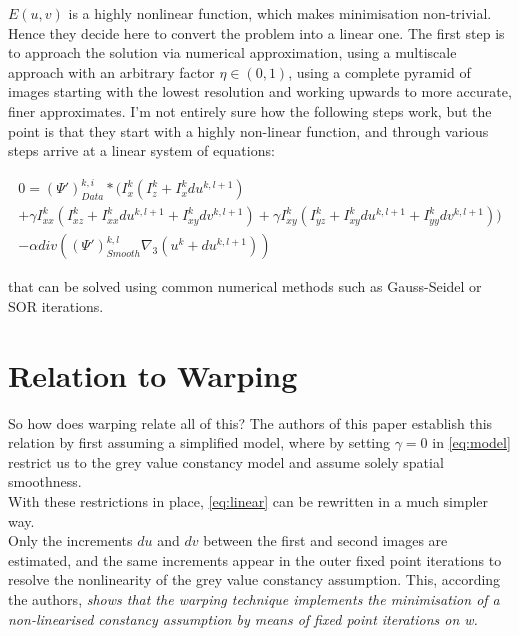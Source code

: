 \documentclass{article}
\begin{document}
$E(u,v)$ is a highly nonlinear function, which makes minimisation non-trivial. Hence they decide here to convert the problem into a linear one. The first step is to approach the solution via numerical approximation, using a multiscale approach with an arbitrary factor $\eta \in (0,1)$, using a complete pyramid of images starting with the lowest resolution and working upwards to more accurate, finer approximates. I'm not entirely sure how the following steps work, but the point is that they start with a highly non-linear function, and through various steps arrive at a linear system of equations:

\begin{equation}
  \label{eq:linear}
  \begin{split}
  0 = (\Psi')^{k,i}_{Data} * (I^k_x(I^k_z + I^k_xdu^{k,l+1})\\
  + \gamma I^k_{xx}(I^k_{xz}+I^k_{xx}du^{k,l+1}+I^k_{xy}dv^{k,l+1}) + \gamma I^k_{xy}(I^k_{yz}+I^k_{xy}du^{k,l+1}+I^k_{yy}dv^{k,l+1}))\\
  - \alpha div ((\Psi')^{k,l}_{Smooth}\nabla_3(u^k+du^{k,l+1}))
  \end{split}
\end{equation}

that can be solved using common numerical methods such as Gauss-Seidel or SOR iterations.

\section{Relation to Warping}
\label{sc:warping}
So how does warping relate all of this? The authors of this paper establish this relation by first assuming a simplified model, where by setting $\gamma = 0$ in \ref{eq:model} restrict us to the grey value constancy model and assume solely spatial smoothness.\\
With these restrictions in place, \ref{eq:linear} can be rewritten in a much simpler way.\\
Only the increments $du$ and $dv$ between the first and second images are estimated, and the same increments appear in the outer fixed point iterations to resolve the nonlinearity of the grey value constancy assumption. This, according the authors, \textit{shows that the warping technique implements the minimisation of a non-linearised constancy assumption by means of fixed point iterations on w.}
\end{document}
